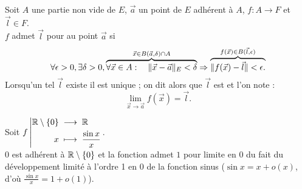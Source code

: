 \documentclass{book}
\begin{document}
\begin{Definition}[Limite]
Soit $A$ une partie non vide de $E$, $\vec{a}$ un point de $E$ adhérent à $A$, $f : A \to F$ et $\vec{l} \in F$.\\
$f$ admet $\vec{l}$ pour  au point $\vec{a}$ si
$$\forall \epsilon >0,  \exists \delta > 0,   \overbrace{\forall \vec{x} \in A: \quad  \mathopen\lVert \vec{x} - \vec{a} \mathclose\rVert_E < \delta}^{\vec{x}\in B(\vec{a},\delta)\cap A}   \Rightarrow \overbrace{\mathopen\lVert f (\vec{x}) - \vec{l} \mathclose\rVert < \epsilon.}^{f(\vec{x})\in B(\vec{l},\epsilon)}$$
Lorsqu'un tel $\vec{l}$ existe il est unique ; on dit alors que $\vec{l}$ est  et l'on note :
$$\lim_{\vec{x}\to\vec{a} } f(\vec{x})= \vec{l}.$$
\end{Definition}
\begin{Exemple}
Soit ${f}\left|\begin{aligned}{\mathbb{R}\setminus \{0\}}&\;\longrightarrow\;{\mathbb{R}}\\{x}&\;\longmapsto\;{\frac{\sin x }{x}}\end{aligned}\right. $.\\
 $0$ est adhérent à $\mathbb{R}\setminus \{0\}$ et la fonction admet $1$ pour limite en $0$ du fait du développement limité à l'ordre 1 en 0 de la fonction sinus ($\sin x = x + o(x)$, d'où $\frac{\sin x}{x} = 1 + o(1)$).
\end{Exemple}

\end{document}
